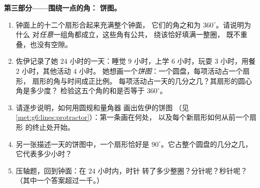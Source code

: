 \begin{problem}
\medskip
\noindent\textbf{第三部分——围绕一点的角：
饼图。}
\begin{enumerate}[resume]
  \item 钟面上的十二个扇形合起来充满整个钟面，
        它们的角之和为 $360^\circ$。请说明为什么
        对\emph{任意}一组角都成立，这些角有公共，
        绕该恰好填满一整圈，
        既不重叠，也没有空隙。
  \item 佐伊记录了她 $24$ 小时的一天：睡觉 $9$ 小时，上学
        $6$ 小时，玩耍 $3$ 小时，用餐 $2$ 小时，其他活动 $4$ 小时。
        她想画一个\emph{饼图}：一个圆盘，每项活动占一个扇形，
        扇形的角与时间成正比例。
        每项活动占一天的几分之几？其扇形的圆心角是多少度？
        检验这五个角的和是否等于
        $360^\circ$。
  \item 请逐步说明，如何用圆规和量角器
        画出佐伊的饼图
        （见\cref{met:g6:lines:protractor}）：第一条画在何处，
        以及每个新扇形如何从前一个扇形
        的终止处开始。
  \item 另一张描述一天的饼图中，一个扇形恰好是
        $90^\circ$。它占整个圆盘的几分之几，
        它代表多少小时？
  \item 压轴题，回到钟面：在 $24$ 小时内，时针
        转了多少整圈？分针呢？秒针呢？
        （其中一个答案超过一千。）
\end{enumerate}
\end{problem}
